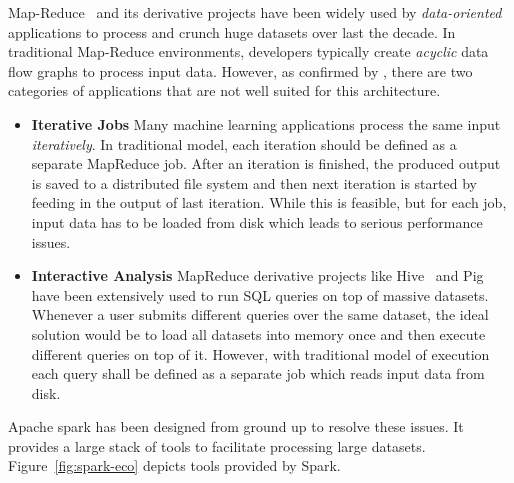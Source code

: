 Map-Reduce~\cite{Dean:2004} and its derivative projects have been widely used by \emph{data-oriented} applications to process and crunch huge datasets over last the decade. In traditional Map-Reduce environments, developers typically create \emph{acyclic} data flow graphs to process input data. However, as confirmed by \textcite{Zaharia:2010}, there are two categories of applications that are not well suited for this architecture.
\begin{itemize}
    \item \textbf{Iterative Jobs} Many machine learning applications process the same input \emph{iteratively}. In traditional model, each iteration should be defined as a separate MapReduce job. After an iteration is finished, the produced output is saved to a distributed file system and then next iteration is started by feeding in the output of last iteration. While this is feasible, but for each job, input data has to be loaded from disk which leads to serious performance issues.
    \item \textbf{Interactive Analysis} MapReduce derivative projects like Hive~\cite{hive} and Pig~\cite{pig} have been extensively used to run SQL queries on top of massive datasets. Whenever a user submits different queries over the same dataset, the ideal solution would be to load all datasets into memory once and then execute different queries on top of it. However, with traditional model of execution each query shall be defined as a separate job which reads input data from disk.
\end{itemize}
Apache spark has been designed from ground up to resolve these issues. It provides a large stack of tools to facilitate processing large datasets. Figure~\ref{fig:spark-eco} depicts tools provided by Spark.
